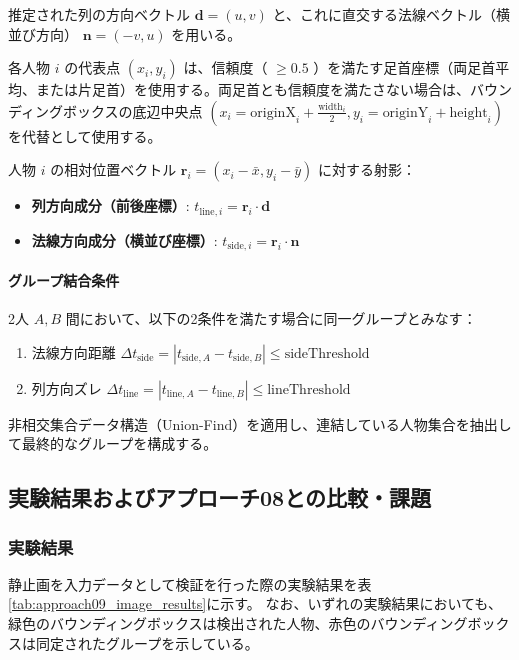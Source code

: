 推定された列の方向ベクトル $\mathbf{d} = (u, v)$ と、これに直交する法線ベクトル（横並び方向） $\mathbf{n} = (-v, u)$ を用いる。

各人物 $i$ の代表点 $(x_i, y_i)$ は、信頼度（ $\ge 0.5$ ）を満たす足首座標（両足首平均、または片足首）を使用する。両足首とも信頼度を満たさない場合は、バウンディングボックスの底辺中央点 $(x_i = \text{originX}_i + \frac{\text{width}_i}{2}, y_i = \text{originY}_i + \text{height}_i)$ を代替として使用する。

人物 $i$ の相対位置ベクトル $\mathbf{r}_i = (x_i - \bar{x}, y_i - \bar{y})$ に対する射影：
\begin{itemize}
    \item \textbf{列方向成分（前後座標）}: $t_{\text{line}, i} = \mathbf{r}_i \cdot \mathbf{d}$
    \item \textbf{法線方向成分（横並び座標）}: $t_{\text{side}, i} = \mathbf{r}_i \cdot \mathbf{n}$
\end{itemize}

\paragraph{グループ結合条件}
2人 $A, B$ 間において、以下の2条件を満たす場合に同一グループとみなす：
\begin{enumerate}
    \item 法線方向距離 $\Delta t_{\text{side}} = |t_{\text{side}, A} - t_{\text{side}, B}| \le \text{sideThreshold}$
    \item 列方向ズレ $\Delta t_{\text{line}} = |t_{\text{line}, A} - t_{\text{line}, B}| \le \text{lineThreshold}$
\end{enumerate}

非相交集合データ構造（Union-Find）を適用し、連結している人物集合を抽出して最終的なグループを構成する。

\subsection{実験結果およびアプローチ08との比較・課題}

\subsubsection{実験結果}
静止画を入力データとして検証を行った際の実験結果を表\ref{tab:approach09_image_results}に示す。
なお、いずれの実験結果においても、緑色のバウンディングボックスは検出された人物、赤色のバウンディングボックスは同定されたグループを示している。

